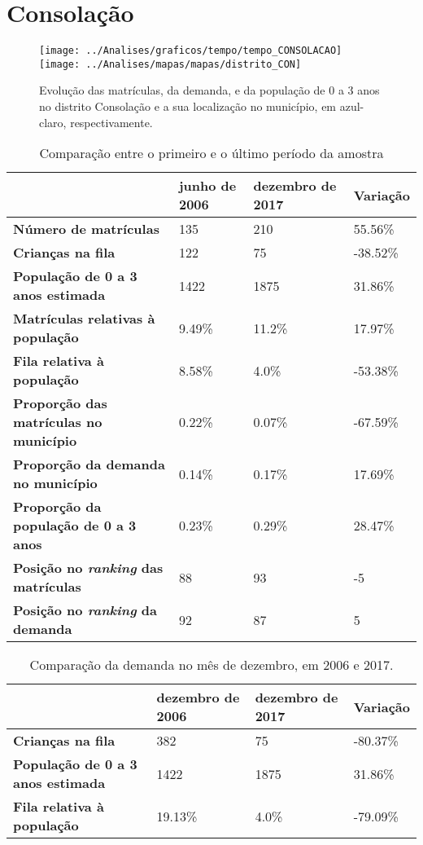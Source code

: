 \section{Consolação}
\begin{figure}[H]
\centering
\texttt{[image: ../Analises/graficos/tempo/tempo\_CONSOLACAO]}
\texttt{[image: ../Analises/mapas/mapas/distrito\_CON]}
\caption{Evolução das matrículas, da demanda, e da população de 0 a 3 anos no distrito Consolação e a sua localização no município, em azul-claro, respectivamente.}
\end{figure}
\begin{table}[H]
\begin{tabular}{l|l|l|l}
\textbf{}                                      & \textbf{junho de 2006}       & \textbf{dezembro de 2017}    & \textbf{Variação} \\ \hline
\textbf{Número de matrículas}                  & 135 & 210 & 55.56\% \\ \hline
\textbf{Crianças na fila}                      & 122 & 75 & -38.52\% \\ \hline
\textbf{População de 0 a 3 anos estimada}      & 1422 & 1875 & 31.86\% \\ \hline
\textbf{Matrículas relativas à população}      & 9.49\% & 11.2\% & 17.97\% \\ \hline
\textbf{Fila relativa à população}             & 8.58\% & 4.0\% & -53.38\% \\ \hline
\textbf{Proporção das matrículas no município} & 0.22\% & 0.07\% & -67.59\% \\ \hline
\textbf{Proporção da demanda no município}     & 0.14\% & 0.17\% & 17.69\% \\ \hline
\textbf{Proporção da população de 0 a 3 anos}  & 0.23\% & 0.29\% & 28.47\% \\ \hline
\textbf{Posição no \textit{ranking} das matrículas}     & 88 & 93 & -5 \\ \hline
\textbf{Posição no \textit{ranking} da demanda}         & 92 & 87 & 5 \\ 
\end{tabular}
\caption{Comparação entre o primeiro e o último período da amostra}
\end{table}
\begin{table}[H]
\begin{tabular}{l|l|l|l}
\textbf{}                                 & \textbf{dezembro de 2006} & \textbf{dezembro de 2017} & \textbf{Variação} \\ \hline
\textbf{Crianças na fila}                      & 382 & 75 & -80.37\% \\ \hline
\textbf{População de 0 a 3 anos estimada}      & 1422 & 1875 & 31.86\% \\ \hline
\textbf{Fila relativa à população}             & 19.13\% & 4.0\% & -79.09\% \\
\end{tabular}
\caption{Comparação da demanda no mês de dezembro, em 2006 e 2017.}
\end{table}
